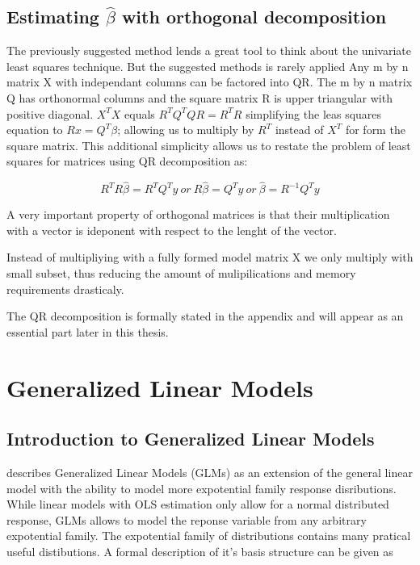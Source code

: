 \documentclass{article}
\begin{document}
    \subsection{Estimating $\widehat{\beta}$ with orthogonal decomposition}
    The previously suggested method lends a great tool to think about the univariate least squares technique. But the suggested methods is rarely applied
    Any m by n matrix X with independant columns can be factored into QR. The m by n matrix Q has orthonormal columns and the square matrix R is upper triangular with positive diagonal. $X^T X$ equals $R^T Q^T QR = R^T R$ simplifying the leas squares equation to $Rx = Q^T \beta$; allowing us to multiply by $R^T$ instead of $X^T$ for form the square matrix.  This additional simplicity allows us to restate the problem of least squares for matrices using QR decomposition as:

    \begin{equation} R^T R \widehat{\beta} = R^TQ^T y  \ or \   R\widehat{\beta}=Q^T y \ or \  \widehat{\beta} = R^{-1} Q^T y \end{equation}

    A very important property of orthogonal matrices is that their multiplication with a  vector is ideponent with respect to the lenght of the vector.

    Instead of multipliying with a fully formed model matrix X we only multiply with small subset, thus reducing the amount of mulipilications and memory requirements drasticaly.

    The QR decomposition is formally stated in the appendix and will appear as an essential part later in this thesis.


    \section{Generalized Linear Models}
    \subsection{Introduction to Generalized Linear Models}
    \cite{glmnelder} describes Generalized Linear Models (GLMs) as an extension of the general linear model with the ability to model more expotential family response disributions. While linear models with OLS estimation only allow for a normal distributed response, GLMs allows to model the reponse variable from any arbitrary expotential family. The expotential family of distributions contains many pratical useful distibutions. A formal description of it's basis structure can be given as
\end{document}
